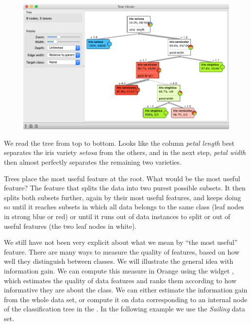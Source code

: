\begin{figure}
    \includegraphics[scale=0.35]{graphics/ch-classification_trees/tree-viewer.png}
    \label{fig:classification-predictions}
\end{figure}

We read the tree from top to bottom. Looks like the column \textit{petal length} best separates the iris variety \textit{setosa} from the others, and in the next step, \textit{petal width} then almost perfectly separates the remaining two varieties.

Trees place the most useful feature at the root. What would be the most useful feature? The feature that splits the data into two purest possible subsets. It then splits both subsets further, again by their most useful features, and keeps doing so until it reaches subsets in which all data belongs to the same class (leaf nodes in strong blue or red) or until it runs out of data instances to split or out of useful features (the two leaf nodes in white).

We still have not been very explicit about what we mean by ``the most useful'' feature. There are many ways to measure the quality of features, based on how well they distinguish between classes. We will illustrate the general idea with information gain. We can compute this measure in Orange using the  widget , which estimates the quality of data features and ranks them according to how informative they are about the class. We can either estimate the information gain from the whole data set, or compute it on data corresponding to an internal node of the classification tree in the . In the following example we use the \textit{Sailing} data set.

